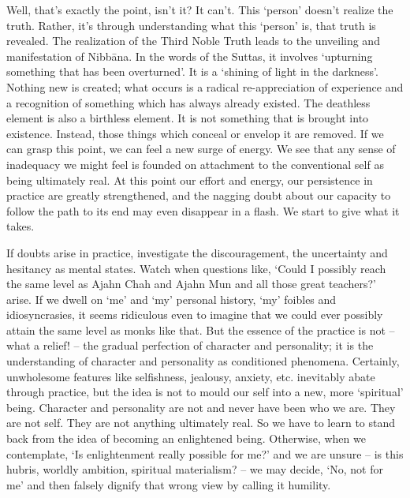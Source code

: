 Well, that's exactly the point, isn't it? It can't. This `person'
doesn't realize the truth. Rather, it's through understanding what this
`person' is, that truth is revealed. The realization of the Third Noble
Truth leads to the unveiling and manifestation of Nibbāna. In the words
of the Suttas, it involves `upturning something that has been
overturned'. It is a `shining of light in the darkness'. Nothing new is
created; what occurs is a radical re-appreciation of experience and a
recognition of something which has always already existed. The deathless
element is also a birthless element. It is not something that is brought
into existence. Instead, those things which conceal or envelop it are
removed. If we can grasp this point, we can feel a new surge of energy.
We see that any sense of inadequacy we might feel is founded on
attachment to the conventional self as being ultimately real. At this
point our effort and energy, our persistence in practice are greatly
strengthened, and the nagging doubt about our capacity to follow the
path to its end may even disappear in a flash. We start to give what it
takes.

If doubts arise in practice, investigate the discouragement, the
uncertainty and hesitancy as mental states. Watch when questions like,
`Could I possibly reach the same level as Ajahn Chah and Ajahn Mun and
all those great teachers?' arise. If we dwell on `me' and `my' personal
history, `my' foibles and idiosyncrasies, it seems ridiculous even to
imagine that we could ever possibly attain the same level as monks like
that. But the essence of the practice is not -- what a relief! -- the
gradual perfection of character and personality; it is the understanding
of character and personality as conditioned phenomena. Certainly,
unwholesome features like selfishness, jealousy, anxiety, etc.
inevitably abate through practice, but the idea is not to mould our self
into a new, more `spiritual' being. Character and personality are not
and never have been who we are. They are not self. They are not anything
ultimately real. So we have to learn to stand back from the idea of
becoming an enlightened being. Otherwise, when we contemplate, `Is
enlightenment really possible for me?' and we are unsure -- is this
hubris, worldly ambition, spiritual materialism? -- we may decide, `No,
not for me' and then falsely dignify that wrong view by calling it
humility.

